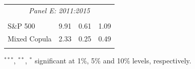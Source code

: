 \documentclass[pdf,9pt,xcolor=dvipsnames,hide notes]{beamer}
\begin{document}
\begin{frame}
\begin{threeparttable}[H]
\begin{tabularx}{\textwidth}{@{\extracolsep{\fill}}llll@{}}
	\multicolumn{4}{c}{\textit{Panel E: 2011:2015}} \\
	&       &       &       \\
	S\&P 500 & 9.91  & 0.61  & 1.09 \\
	Mixed Copula & 2.33  & 0.25  & 0.49 \\
	\multicolumn{1}{r}{} & \multicolumn{1}{r}{} & \multicolumn{1}{r}{} & \multicolumn{1}{r}{} \\
	\bottomrule
\end{tabularx}%
\begin{tablenotes}
	\item \scriptsize $^{\ast\ast\ast}$, $^{\ast\ast}$, $^{\ast}$  significant at 1\%, 5\% and 10\% levels, respectively.
\end{tablenotes}
\label{tab:table109}%
\end{threeparttable}%

\end{frame}
\end{document}
